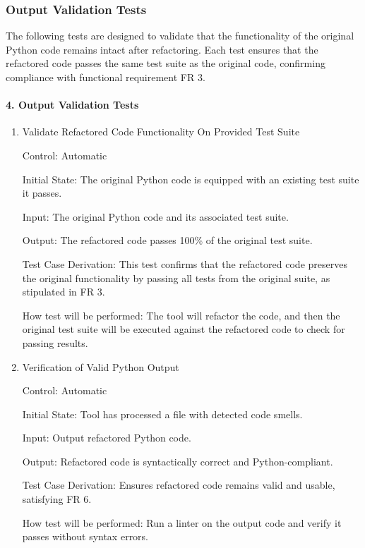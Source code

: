 \documentclass[12pt, titlepage]{article}
\begin{document}
\subsubsection{Output Validation Tests}

The following tests are designed to validate that the functionality of the original Python code remains intact after refactoring. Each test ensures that the refactored code passes the same test suite as the original code, confirming compliance with functional requirement FR 3.
		
\paragraph{4. Output Validation Tests}
\begin{enumerate}
  \item{Validate Refactored Code Functionality On Provided Test Suite\\}

  Control: Automatic
  
  Initial State: The original Python code is equipped with an existing test suite it passes.
  
  Input: The original Python code and its associated test suite.
  
  Output: The refactored code passes 100\% of the original test suite.
  
  Test Case Derivation: This test confirms that the refactored code preserves the original functionality by passing all tests from the original suite, as stipulated in FR 3.
  
  How test will be performed: The tool will refactor the code, and then the original test suite will be executed against the refactored code to check for passing results.
  
  \item{Verification of Valid Python Output\\}

  Control: Automatic
  
  Initial State: Tool has processed a file with detected code smells.
  
  Input: Output refactored Python code.
  
  Output: Refactored code is syntactically correct and Python-compliant.
  
  Test Case Derivation: Ensures refactored code remains valid and usable, satisfying FR 6.
  
  How test will be performed: Run a linter on the output code and verify it passes without syntax errors.
  
\end{enumerate}
\end{document}
